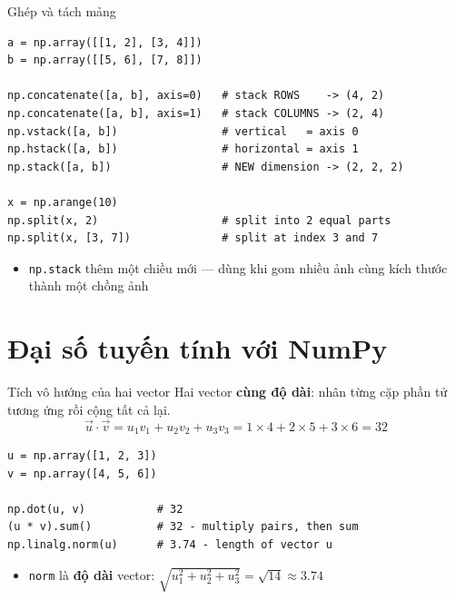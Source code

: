 \documentclass[11pt]{beamer}
\begin{document}
\begin{frame}[fragile]{Ghép và tách mảng}
\begin{lstlisting}
a = np.array([[1, 2], [3, 4]])
b = np.array([[5, 6], [7, 8]])

np.concatenate([a, b], axis=0)   # stack ROWS    -> (4, 2)
np.concatenate([a, b], axis=1)   # stack COLUMNS -> (2, 4)
np.vstack([a, b])                # vertical   = axis 0
np.hstack([a, b])                # horizontal = axis 1
np.stack([a, b])                 # NEW dimension -> (2, 2, 2)

x = np.arange(10)
np.split(x, 2)                   # split into 2 equal parts
np.split(x, [3, 7])              # split at index 3 and 7
\end{lstlisting}
\begin{itemize}
  \item \texttt{np.stack} thêm một chiều mới --- dùng khi gom nhiều ảnh cùng kích thước thành một chồng ảnh
\end{itemize}
\end{frame}

\section{Đại số tuyến tính với NumPy}

\begin{frame}[fragile]{Tích vô hướng của hai vector}
Hai vector \textbf{cùng độ dài}: nhân từng cặp phần tử tương ứng rồi cộng tất cả lại.
\[
  \vec{u} \cdot \vec{v} = u_1 v_1 + u_2 v_2 + u_3 v_3
  = 1{\times}4 + 2{\times}5 + 3{\times}6 = 32
\]
\begin{lstlisting}
u = np.array([1, 2, 3])
v = np.array([4, 5, 6])

np.dot(u, v)           # 32
(u * v).sum()          # 32 - multiply pairs, then sum
np.linalg.norm(u)      # 3.74 - length of vector u
\end{lstlisting}
\begin{itemize}
  \item \texttt{norm} là \textbf{độ dài} vector: $\sqrt{u_1^2 + u_2^2 + u_3^2} = \sqrt{14} \approx 3.74$
\end{itemize}
\end{frame}
\end{document}
